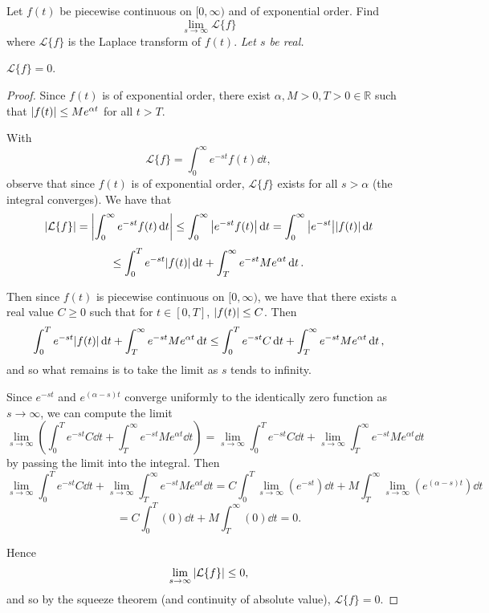 \documentclass[11pt]{article}
\newcommand{\br}[1]{\left(#1\right)}
\newcommand{\sbr}[1]{\left[#1\right]}
\newcommand{\cbr}[1]{\{#1\}}
\begin{document}
Let $f(t)$ be piecewise continuous on $[0,\infty)$ and of exponential order. Find $$\lim_{s\to \infty}\mathcal{L}\{f\}$$ where $\mathcal{L}\{f\}$ is the Laplace transform of $f(t)$. \textit{Let $s$ be real.}\vspace{1cm}

$\mathcal{L}\cbr{f} = 0$.

\begin{proof}
Since $f(t)$ is of exponential order, there exist $\alpha, M>0, T>0 \in\mathbb{R}$ such that $\abs{f(t)}\leq Me^{\alpha{t}}$ for all $t>T$.

With $$\mathcal{L}\cbr{f} = \int_0^{\infty}e^{-st}f(t)\dd{t},$$ observe that since $f(t)$ is of exponential order, $\mathcal{L}\cbr{f}$ exists for all $s>\alpha$ (the integral converges). We have that $$\abs{\mathcal{L}\cbr{f}} = \abs{\int_0^{\infty}e^{-st}f(t)\dd{t}} \leq \int_0^{\infty}\abs{e^{-st}f(t)}\dd{t} = \int_0^{\infty}\abs{e^{-st}}\abs{f(t)}\dd{t}$$ $$\leq \int_0^{T}e^{-st}\abs{f(t)}\dd{t} + \int_T^{\infty}e^{-st}Me^{\alpha t}\dd{t}.$$

Then since $f(t)$ is piecewise continuous on $[0,\infty)$, we have that there exists a real value $C\geq 0$ such that for $t\in\sbr{0,T}$, $\abs{f(t)}\leq C$. Then $$\int_0^{T}e^{-st}\abs{f(t)}\dd{t} + \int_T^{\infty}e^{-st}Me^{\alpha t}\dd{t} \leq \int_0^{T}e^{-st} C\dd{t} + \int_T^{\infty}e^{-st}Me^{\alpha t}\dd{t},$$ and so what remains is to take the limit as $s$ tends to infinity.

Since $e^{-st}$ and $e^{(\alpha -s)t}$ converge uniformly to the identically zero function as $s\to \infty$, we can compute the limit $$\lim_{s\to\infty} \br{\int_0^{T}e^{-st} C\dd{t} + \int_T^{\infty}e^{-st}Me^{\alpha t}\dd{t}} = \lim_{s\to\infty}\int_0^{T}e^{-st} C\dd{t} + \lim_{s\to\infty}\int_T^{\infty}e^{-st}Me^{\alpha t}\dd{t}$$ by passing the limit into the integral. Then $$\lim_{s\to\infty}\int_0^{T}e^{-st} C\dd{t} + \lim_{s\to\infty}\int_T^{\infty}e^{-st}Me^{\alpha t}\dd{t} = C\int_0^{T}\lim_{s\to\infty}\br{e^{-st}} \dd{t} + M\int_T^{\infty}\lim_{s\to\infty}\br{e^{(\alpha-s)t}}\dd{t}$$ $$= C\int_0^T \br{0}\dd{t} + M\int_T^{\infty}\br{0}\dd{t} = 0.$$

Hence $$\lim_{s\to \infty} \abs{\mathcal{L}\cbr{f}}\leq 0,$$ and so by the squeeze theorem (and continuity of absolute value), $\mathcal{L}\cbr{f} = 0$.
\end{proof}
\end{document}
